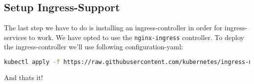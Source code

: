 \subsection{Setup Ingress-Support}
The last step we have to do is installing an ingress-controller in order for ingress-services to work. We have opted to use the \texttt{nginx-ingress} controller.
To deploy the ingress-controller we'll use following configuration-yaml:
\begin{lstlisting}[language=bash,caption=Deploy nginx-ingress as ingress-controller] 
kubectl apply -f https://raw.githubusercontent.com/kubernetes/ingress-nginx/controller-v1.5.1/deploy/static/provider/cloud/deploy.yaml
\end{lstlisting}
And thats it!
